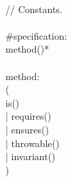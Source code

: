 \begin{bigbigpre}
 \\
// Constants. \\
 \\
#specification: \\
    method()* \\
 \\
method: \\
    ( \\
        is() \\
      | requires() \\
      | ensures() \\
      | throwable() \\
      | invariant() \\
    ) \\

\end{bigbigpre}
